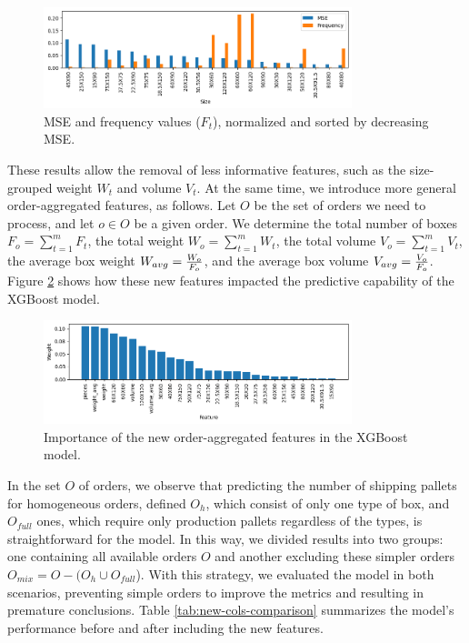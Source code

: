 \documentclass[runningheads]{llncs}
\newcommand{\rev}[1]{{#1}}
\begin{document}
\begin{figure}[H]
\centering
\includegraphics[width=0.8\textwidth]{figures/mse-vs-freq.png}
\caption{MSE and frequency values ($F_t$), normalized and sorted by decreasing MSE.} \label{fig:mse-vs-freq}
\end{figure}


These results allow the removal of less informative features, such as the size-grouped weight $W_t$ and volume $V_t$. 
\rev{At the same time, we introduce more general order-aggregated features, as follows. Let $O$ be the set of orders we need to process, and let $o \in O$ be a given order. We determine the total number of boxes $F_o = \sum_{t=1}^{m}{F_{t}}$, the total weight $W_{o} = \sum_{t=1}^{m}{W_{t}}$, the total volume $V_{o} = \sum_{t=1}^{m}{V_{t}} $, the average box weight $W_{avg} = {W_{o} \over F_{o}}$, and the average box volume $V_{avg} = {V_{o} \over F_{o}}$.} Figure \ref{fig:feat-weights-2} shows how these new features impacted the predictive capability of the XGBoost model.

\begin{figure}
\centering
\includegraphics[width=0.8\textwidth]{figures/feat-weights-2.png}
\caption{Importance of the new order-aggregated features in the XGBoost model.} \label{fig:feat-weights-2}
\end{figure}


In the set $O$ of orders, we observe that predicting the number of shipping pallets for homogeneous orders, defined $O_h$, which consist of only one type of box, and $O_{full}$ ones, which require only production pallets regardless of the types, is straightforward for the model. In this way, we divided results into two groups: one containing all available orders $O$ and another excluding these simpler orders $O_{mix} = O - (O_h \cup O_{full}$). With this strategy, we evaluated the model in both scenarios, preventing simple orders to improve the metrics and resulting in premature conclusions. Table \ref{tab:new-cols-comparison} summarizes the model's performance before and after including the new features.
\end{document}
